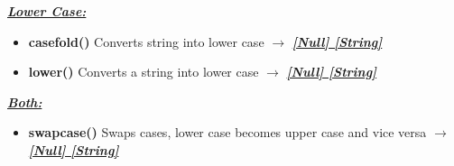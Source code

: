\documentclass{report}
\begin{document}
      \bigbreak \noindent 
      \textbf{\textit{\underline{Lower Case:}}}
      \begin{itemize}
        \item[\ding{43}] \textbf{casefold()}	Converts string into lower case $\longrightarrow$ \textbf{\textit{\underline{[Null] [String]}}}
        \item[\ding{43}] \textbf{lower()}	Converts a string into lower case $\longrightarrow$ \textbf{\textit{\underline{[Null] [String]}}}
      \end{itemize}

      \bigbreak \noindent 
      \textbf{\textit{\underline{Both:}}}
      \begin{itemize}
        \item[\ding{43}] \textbf{swapcase()}	Swaps cases, lower case becomes upper case and vice versa $\longrightarrow$ \textbf{\textit{\underline{[Null] [String]}}}
      \end{itemize}
    

    \bigbreak \noindent 
    
\end{document}
